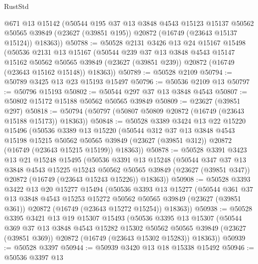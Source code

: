 \begin{lexlean}{RustStd}
\begin{coremodule}
      @671
      @13
      @15142
      (@50544
        @195
        @37
        @13
        @3848
        @4543
        @15123
        @15137
        @50562
        @50565
        @39849
        (@23627 (@39851 @195))
        @20872
        (@16749 (@23643 @15137 @15124))
        @18363))
@50788 := @50528
    @2131
    @3426
    @13
    @24
    @15167
    @15498
    (@50536
      @2131
      @13
      @15167
      (@50544
        @239
        @37
        @13
        @3848
        @4543
        @15147
        @15162
        @50562
        @50565
        @39849
        (@23627 (@39851 @239))
        @20872
        (@16749 (@23643 @15162 @15148))
        @18363))
@50789 := @50528 @2109
@50794 := @50789 @3425 @13 @23 @15193 @15497
@50796 := @50536 @2109 @13
@50797 := @50796 @15193
@50802 := @50544 @297 @37 @13 @3848 @4543
@50807 := @50802 @15172 @15188 @50562 @50565 @39849
@50809 := @23627 (@39851 @297)
@50818 := @50794 (@50797 (@50807 @50809 @20872 (@16749 (@23643 @15188 @15173)) @18363))
@50848 := @50528
    @3389
    @3424
    @13
    @22
    @15220
    @15496
    (@50536
      @3389
      @13
      @15220
      (@50544
        @312
        @37
        @13
        @3848
        @4543
        @15198
        @15215
        @50562
        @50565
        @39849
        (@23627 (@39851 @312))
        @20872
        (@16749 (@23643 @15215 @15199))
        @18363))
@50878 := @50528
    @3391
    @3423
    @13
    @21
    @15248
    @15495
    (@50536
      @3391
      @13
      @15248
      (@50544
        @347
        @37
        @13
        @3848
        @4543
        @15225
        @15243
        @50562
        @50565
        @39849
        (@23627 (@39851 @347))
        @20872
        (@16749 (@23643 @15243 @15226))
        @18363))
@50908 := @50528
    @3393
    @3422
    @13
    @20
    @15277
    @15494
    (@50536
      @3393
      @13
      @15277
      (@50544
        @361
        @37
        @13
        @3848
        @4543
        @15253
        @15272
        @50562
        @50565
        @39849
        (@23627 (@39851 @361))
        @20872
        (@16749 (@23643 @15272 @15254))
        @18363))
@50938 := @50528
    @3395
    @3421
    @13
    @19
    @15307
    @15493
    (@50536
      @3395
      @13
      @15307
      (@50544
        @369
        @37
        @13
        @3848
        @4543
        @15282
        @15302
        @50562
        @50565
        @39849
        (@23627 (@39851 @369))
        @20872
        (@16749 (@23643 @15302 @15283))
        @18363))
@50939 := @50528 @3397
@50944 := @50939 @3420 @13 @18 @15338 @15492
@50946 := @50536 @3397 @13

\end{coremodule}
\end{lexlean}
